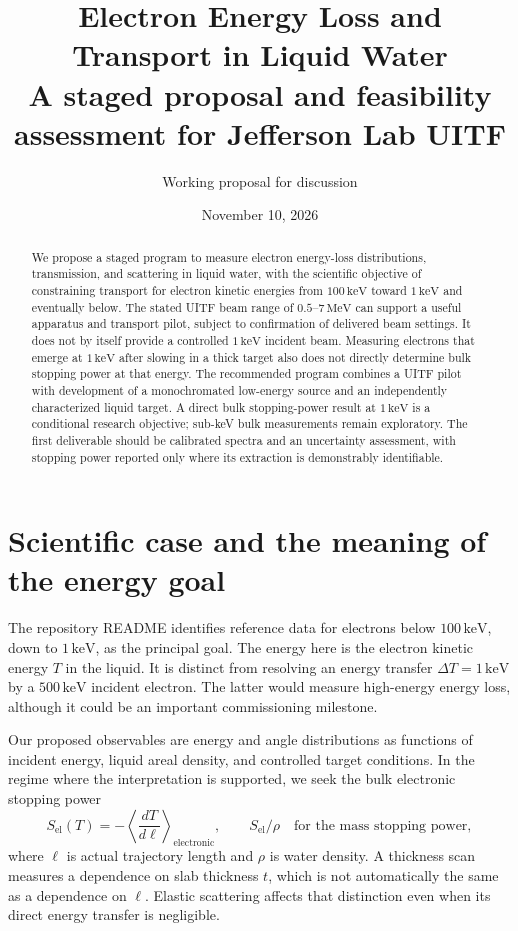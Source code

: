 \documentclass[11pt,letterpaper]{article}
\title{Electron Energy Loss and Transport in Liquid Water\\
  \large A staged proposal and feasibility assessment for Jefferson Lab UITF}
\author{Working proposal for discussion}
\date{November 10, 2026}
\newcommand{\keV}{\,\mathrm{keV}}
\newcommand{\MeV}{\,\mathrm{MeV}}
\begin{document}
\maketitle

\begin{abstract}
We propose a staged program to measure electron energy-loss distributions, transmission, and scattering
in liquid water, with the scientific objective of constraining transport for electron kinetic energies
from $100\keV$ toward $1\keV$ and eventually below. The stated UITF beam range of
$0.5$--$7\MeV$ can support a useful apparatus and transport pilot, subject to confirmation of delivered
beam settings. It does not by itself provide a controlled $1\keV$ incident beam. Measuring electrons
that emerge at $1\keV$ after slowing in a thick target also does not directly determine bulk stopping
power at that energy. The recommended program combines a UITF pilot with development of a
monochromated low-energy source and an independently characterized liquid target. A direct bulk
stopping-power result at $1\keV$ is a conditional research objective; sub-keV bulk measurements remain
exploratory. The first deliverable should be calibrated spectra and an uncertainty assessment, with
stopping power reported only where its extraction is demonstrably identifiable.
\end{abstract}

\section{Scientific case and the meaning of the energy goal}

The repository README identifies reference data for electrons below $100\keV$, down to $1\keV$, as
the principal goal. The energy here is the electron kinetic energy $T$ in the liquid. It is distinct
from resolving an energy transfer $\Delta T=1\keV$ by a $500\keV$ incident electron. The latter would
measure high-energy energy loss, although it could be an important commissioning milestone.

Our proposed observables are energy and angle distributions as functions of incident energy, liquid
areal density, and controlled target conditions. In the regime where the interpretation is supported,
we seek the bulk electronic stopping power
\begin{equation}
  S_{\mathrm{el}}(T)=-\left\langle\frac{dT}{d\ell}\right\rangle_{\mathrm{electronic}},
  \qquad S_{\mathrm{el}}/\rho\quad\text{for the mass stopping power},
\end{equation}
where $\ell$ is actual trajectory length and $\rho$ is water density. A thickness scan measures a
dependence on slab thickness $t$, which is not automatically the same as a dependence on $\ell$.
Elastic scattering affects that distinction even when its direct energy transfer is negligible.
\end{document}
